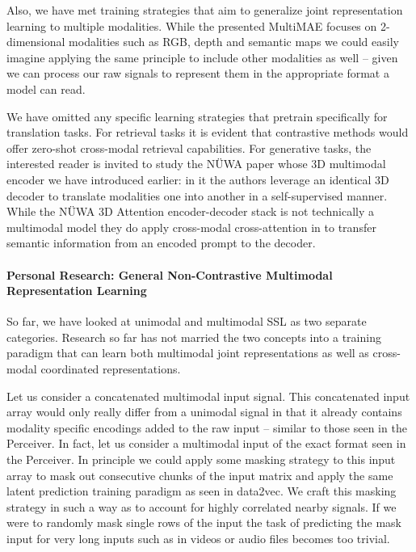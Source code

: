 \documentclass[
]{krantz}
\begin{document}
Also, we have met training strategies that aim to generalize joint representation learning to multiple modalities. While the presented MultiMAE focuses on 2-dimensional modalities such as RGB, depth and semantic maps we could easily imagine applying the same principle to include other modalities as well -- given we can process our raw signals to represent them in the appropriate format a model can read.

We have omitted any specific learning strategies that pretrain specifically for translation tasks. For retrieval tasks it is evident that contrastive methods would offer zero-shot cross-modal retrieval capabilities. For generative tasks, the interested reader is invited to study the NÜWA paper whose 3D multimodal encoder we have introduced earlier: in it the authors leverage an identical 3D decoder to translate modalities one into another in a self-supervised manner. While the NÜWA 3D Attention encoder-decoder stack is not technically a multimodal model they do apply cross-modal cross-attention in to transfer semantic information from an encoded prompt to the decoder.

\hypertarget{personal-research-general-non-contrastive-multimodal-representation-learning}{%
\paragraph{Personal Research: General Non-Contrastive Multimodal Representation Learning}\label{personal-research-general-non-contrastive-multimodal-representation-learning}}

So far, we have looked at unimodal and multimodal SSL as two separate categories. Research so far has not married the two concepts into a training paradigm that can learn both multimodal joint representations as well as cross-modal coordinated representations.

Let us consider a concatenated multimodal input signal. This concatenated input array would only really differ from a unimodal signal in that it already contains modality specific encodings added to the raw input -- similar to those seen in the Perceiver. In fact, let us consider a multimodal input of the exact format seen in the Perceiver. In principle we could apply some masking strategy to this input array to mask out consecutive chunks of the input matrix and apply the same latent prediction training paradigm as seen in data2vec. We craft this masking strategy in such a way as to account for highly correlated nearby signals. If we were to randomly mask single rows of the input the task of predicting the mask input for very long inputs such as in videos or audio files becomes too trivial.
\end{document}
